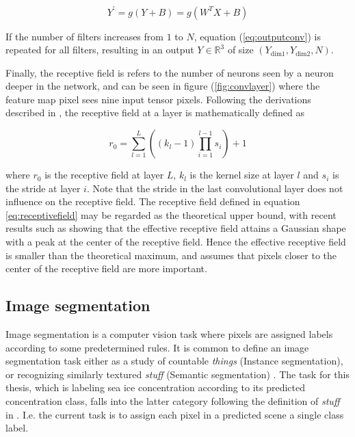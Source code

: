 \documentclass[../main/thesis.tex]{subfiles}
\begin{document}
\begin{equation}
    \label{eq:outputconv}
    Y^\prime = g(Y + B) = g(W^TX + B)
\end{equation}

If the number of filters increases from $1$ to $N$, equation (\ref{eq:outputconv}) is repeated for all filters, resulting in an output $Y \in{\mathbb{R}^3}$ of size $(Y_\text{dim1}, Y_\text{dim2}, N)$.

Finally, the receptive field is refers to the number of neurons seen by a neuron deeper in the network, and can be seen in figure (\ref{fig:convlayer}) where the feature map pixel sees nine input tensor pixels. Following the derivations described in \citet{Araujo2019}, the receptive field at a layer is mathematically defined as

\begin{equation}
    \label{eq:receptivefield}
    r_0 = \sum_{l=1}^L\left(\left(k_l - 1\right)\prod_{i=1}^{l-1}s_i\right) + 1
\end{equation}

where $r_0$ is the receptive field at layer $L$, $k_l$ is the kernel size at layer $l$ and $s_i$ is the stride at layer $i$. Note that the stride in the last convolutional layer does not influence on the receptive field. The receptive field defined in equation \ref{eq:receptivefield} may be regarded as the theoretical upper bound, with recent results such as \citet{Luo2017} showing that the effective receptive field attains a Gaussian shape with a peak at the center of the receptive field. Hence the effective receptive field is smaller than the theoretical maximum, and assumes that pixels closer to the center of the receptive field are more important.

\subsection{Image segmentation}
\label{sec:image-segmentation}
Image segmentation is a computer vision task where pixels are assigned labels according to some predetermined rules. It is common to define an image segmentation task either as a study of countable \textit{things} (Instance segmentation), or recognizing similarly textured \textit{stuff} (Semantic segmentation) \citep{Kirillov2018}. The task for this thesis, which is labeling sea ice concentration according to its predicted concentration class, falls into the latter category following the definition of \textit{stuff} in \citet{Adelson2001}. I.e. the current task is to assign each pixel in a predicted scene a single class label.
\end{document}

